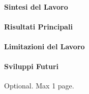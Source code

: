 \documentclass[12pt,a4paper,openright,twoside]{book}
\begin{document}
\paragraph{Sintesi del Lavoro}

\paragraph{Risultati Principali}

\paragraph{Limitazioni del Lavoro}

\paragraph{Sviluppi Futuri}

\backmatter

\nocite{*}




\begin{acknowledgements}
   Optional. Max 1 page.
\end{acknowledgements}
\end{document}
